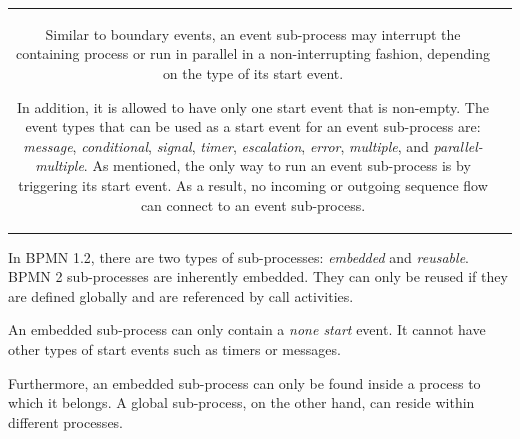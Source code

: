 \begin{table}[H]
\begin{tabular}{ cp{10cm} }
Similar to boundary events, an event sub-process may interrupt the containing process or run in parallel in a non-interrupting fashion, depending on the type of its start event. 

In addition, it is allowed to have only one start event that is non-empty. The event types that can be used as a start event for an event sub-process are: \emph{message}, \emph{conditional}, \emph{signal}, \emph{timer}, \emph{escalation}, \emph{error}, \emph{multiple}, and \emph{parallel-multiple}. As mentioned, the only way to run an event sub-process is by triggering its start event. As a result, no incoming or outgoing sequence flow can connect to an event sub-process.
\\ %
\end{tabular}
\end{table}

In BPMN 1.2, there are two types of sub-processes: \emph{embedded} and \emph{reusable}. BPMN 2 sub-processes are inherently embedded. They can only be reused if they are defined globally and are referenced by call activities.

An embedded sub-process can only contain a \emph{none start} event. It cannot have  other types of start events such as timers or messages. %

Furthermore, an embedded sub-process can only be found inside a process to which it belongs. A global sub-process, on the other hand, can reside within different processes. %

